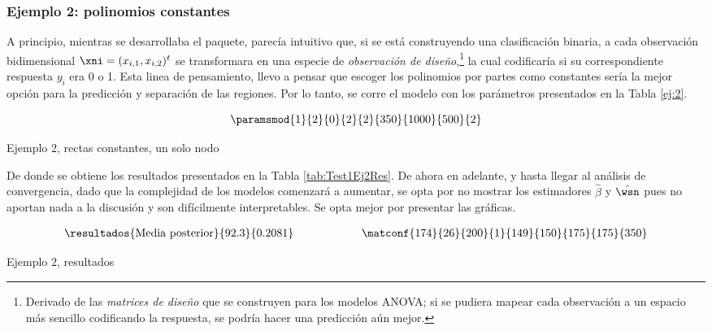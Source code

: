 \subsubsection*{Ejemplo 2: polinomios constantes}
A principio, mientras se desarrollaba el paquete, parecía intuitivo
que, si se está construyendo una clasificación binaria, a cada observación bidimensional $\xni = (x_{i,1}, x_{i,2})^t$ se transformara en una especie de \textit{observación de diseño},\footnote{Derivado de las \textit{matrices de diseño} que se construyen para los modelos ANOVA; si se pudiera mapear cada observación a un espacio más sencillo codificando la respuesta, se podría hacer una predicción aún mejor.} la cual codificaría si su correspondiente respuesta $y_i$ era 0 o 1. Esta linea de pensamiento, llevo a pensar que escoger los polinomios por partes como constantes sería la mejor opción para la predicción y separación de las regiones. Por lo tanto, se corre el modelo con los parámetros presentados en la Tabla \ref{ej:2}.
\begin{table}[h]
$$\paramsmod{1}{2}{0}{2}{2}{350}{1000}{500}{2}$$
\caption{Ejemplo 2, rectas constantes, un solo nodo}
\label{ej:2}
\end{table}

De donde se obtiene los resultados presentados en la Tabla \ref{tab:Test1Ej2Res}. De ahora en adelante, y hasta llegar al análisis de convergencia, dado que la complejidad de los modelos comenzará a aumentar, se opta por no mostrar los estimadores $\hat{\beta}$ y $\hat{\wsn}$ pues no aportan nada a la discusión y son difícilmente interpretables. Se opta mejor por presentar las gráficas. 

\begin{table}[h]
\begin{align*}
\resultados{\text{Media posterior}}{92.3}{0.2081}
\qquad\qquad\qquad
\matconf{174}{26}{200}{1}{149}{150}{175}{175}{350}
\end{align*} 
\caption{Ejemplo 2, resultados}
\label{tab:Test1Ej2Res}
\end{table}

